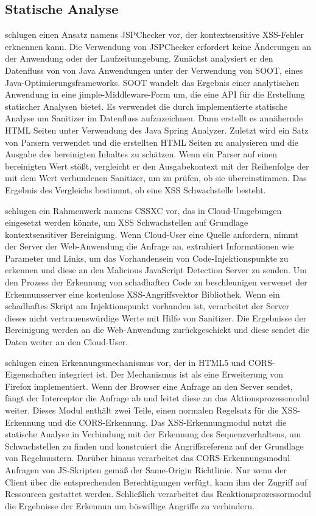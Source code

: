 \subsection{Statische Analyse}
\label{subsection:Method1}

\textcite[59]{steinhauser2016} schlugen einen Ansatz namens JSPChecker vor, der kontextsensitive XSS-Fehler erknennen kann. Die Verwendung von JSPChecker erfordert keine Änderungen an der Anwendung oder der Laufzeitumgebung. Zunächst analysiert er den Datenfluss von von Java Anwendungen unter der Verwendung von SOOT, eines Java-Optimierungsframeworks. SOOT wandelt das Ergebnis einer analytischen Anwendung in eine jimple-Middleware-Form um, die eine API für die Erstellung statischer Analysen bietet. Es verwendet die durch implementierte statische Analyse um Sanitizer im Datenfluss aufzuzeichnen. Dann erstellt es annähernde HTML Seiten unter Verwendung des Java Spring Analyzer. Zuletzt wird ein Satz von Parsern verwendet und die erstellten HTML Seiten zu analysieren und die Ausgabe des bereinigten Inhaltes zu schätzen. Wenn ein Parser auf einen bereinigten Wert stößt, vergleicht er den Ausgabekontext mit der Reihenfolge der mit dem Wert verbundenen Sanitizer, um zu prüfen, ob sie übereinstimmen. Das Ergebnis des Vergleichs bestimmt, ob eine XSS Schwachstelle besteht.

\textcite[200]{gupta2016a} schlugen ein Rahmenwerk namens CSSXC vor, das in Cloud-Umgebungen eingesetzt werden könnte, um XSS Schwachstellen auf Grundlage kontextsensitiver Bereinigung. Wenn Cloud-User eine Quelle anfordern, nimmt der Server der Web-Anwendung die Anfrage an, extrahiert Informationen wie Parameter und Links, um das Vorhandensein von Code-Injektionspunkte zu erkennen und diese an den Malicious JavaScript Detection Server zu senden. Um den Prozess der Erkennung von schadhaften Code zu beschleunigen verwenet der Erkennunsserver eine kostenlose XSS-Angriffsvektor Bibliothek. Wenn ein schadhaftes Skript am Injektionspunkt vorhanden ist, verarbeitet der Server dieses nicht vertrauenswürdige Werte mit Hilfe von Sanitizer. Die Ergebnisse der Bereinigung werden an die Web-Anwendung zurückgeschickt und diese sendet die Daten weiter an den Cloud-User.

\textcite[265]{wang2016} schlugen einen Erkennungsmechanismus vor, der in HTML5 und CORS-Eigenschaften integriert ist. Der Mechanismus ist als eine Erweiterung von Firefox implementiert. Wenn der Browser eine Anfrage an den Server sendet, fängt der Interceptor die Anfrage ab und leitet diese an das Aktionsprozessmodul weiter. Dieses Modul enthält zwei Teile, einen normalen Regelsatz für die XSS-Erkennung und die CORS-Erkennung. Das XSS-Erkennungmodul nutzt die statische Analyse in Verbindung mit der Erkennung des Sequenzverhaltens, um Schwachstellen zu finden und konstruiert die Angriffsreferenz auf der Grundlage von Regelmustern. Darüber hinaus verarbeitet das CORS-Erkennungsmodul Anfragen von JS-Skripten gemäß der Same-Origin Richtlinie. Nur wenn der Client über die entsprechenden Berechtigungen verfügt, kann ihm der Zugriff auf Ressourcen gestattet werden. Schließlich verarbeitet das Reaktionsprozessormodul die Ergebnisse der Erkennun um böswillige Angriffe zu verhindern.


